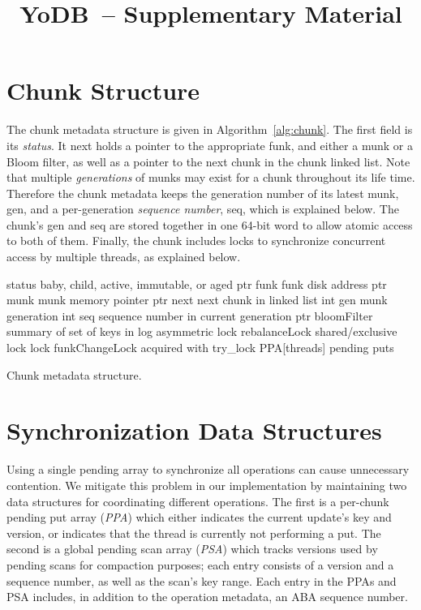 \documentclass[letterpaper,twocolumn,10pt]{article}
\date{}
\newcommand{\code}[1]{\textsf{\fontsize{9}{11}\selectfont #1}}
\newcommand{\sys}{YoDB}
\begin{document}
\title{\sys\ -- Supplementary Material} 
\author{}
\maketitle

\section{Chunk Structure}
The chunk metadata structure is given in Algorithm~\ref{alg:chunk}. 
The first field is its \emph{status}. 
It next holds a pointer to the appropriate funk, and either a munk or a Bloom filter, as well as a pointer to the next 
chunk in the chunk linked list.
Note that multiple \emph{generations} of munks may exist for a chunk throughout its life time.
Therefore the chunk metadata keeps the generation number of its latest munk, \code{gen}, and a per-generation \emph{sequence number},
\code{seq}, which is explained below. The chunk's \code{gen} and \code{seq} are stored together in one 64-bit word to allow 
atomic access to both of them. 
Finally, the chunk includes locks to synchronize concurrent access by multiple threads, as explained below.

\begin{algorithm}[htb]
\begin{algorithmic}
\State \code{status} \Comment  baby, child, active, immutable, or aged
\State ptr \code{funk} \Comment funk disk address
\State ptr \code{munk} \Comment munk memory pointer
\State ptr \code{next} \Comment next chunk in linked list
\State int \code{gen} \Comment munk generation
\State int \code{seq} \Comment sequence number in current generation 
\State ptr \code{bloomFilter} \Comment summary of set of keys in \code{log}
\State asymmetric lock \code{rebalanceLock} \Comment shared/exclusive lock 
\State lock \code{funkChangeLock} \Comment acquired with try\_lock 
\State \code{PPA[threads]} \Comment pending puts
\end{algorithmic}
\caption{Chunk metadata structure.}
\label{alg:chunk}
\end{algorithm}

\section{Synchronization Data Structures}
Using a single pending array to synchronize all
operations can cause unnecessary contention.
We mitigate this problem in our implementation by maintaining two data structures for coordinating different operations. The first is a per-chunk pending put array (\emph{PPA}) which 
either indicates the current update's key and version, or indicates that the thread is currently not performing a put.
The second is a global pending scan array (\emph{PSA}) which tracks versions used by pending scans for compaction purposes; each entry consists of a version and a sequence number, as well as the scan’s key range. Each entry in the \code{PPA}s and \code{PSA} includes, in addition to the operation metadata, an ABA sequence number. 
\end{document}
